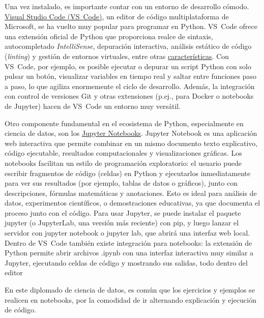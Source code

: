 Una vez instalado, es importante contar con un entorno de desarrollo cómodo. \href{https://code.visualstudio.com/}{Visual Studio Code (VS Code)}, 
un editor de código multiplataforma de Microsoft, se ha vuelto muy popular para programar en Python. VS Code ofrece una extensión oficial de Python 
que proporciona realce de sintaxis, autocompletado \textit{IntelliSense}, depuración interactiva, análisis estático de código (\textit{linting}) 
y gestión de entornos virtuales, entre otras \href{https://code.visualstudio.com/docs/languages/python#:~:text=Working%20with%20Python%20in%20Visual,including%20virtual%20and%20conda%20environments}{características}.
Con VS Code, por ejemplo, es posible ejecutar o depurar un script Python con solo pulsar un botón, visualizar variables en tiempo real y saltar entre
 funciones paso a paso, lo que agiliza enormemente el ciclo de desarrollo. Además, la integración con control de versiones Git y otras extensiones 
 (p.ej., para Docker o notebooks de Jupyter) hacen de VS Code un entorno muy versátil.

Otro componente fundamental en el ecosistema de Python, especialmente en ciencia de datos, son los \href{https://code.visualstudio.com/docs/datascience/jupyter-notebooks#:~:text=Jupyter%20Notebooks%20in%20VS%20Code,on%20one%20canvas%20called}
{Jupyter Notebooks}. Jupyter Notebook es una aplicación web interactiva que permite combinar en un mismo documento texto explicativo, 
código ejecutable, resultados computacionales y visualizaciones gráficas. Los notebooks facilitan un estilo de programación exploratorio: 
el usuario puede escribir fragmentos de código (celdas) en Python y ejecutarlos inmediatamente para ver sus resultados (por ejemplo, tablas de datos 
o gráficos), junto con descripciones, fórmulas matemáticas y anotaciones. 
Esto es ideal para análisis de datos, experimentos científicos, o demostraciones educativas, ya que documenta el proceso junto con el código. 
Para usar Jupyter, se puede instalar el paquete jupyter (o JupyterLab, una versión más reciente) con pip, y luego lanzar el servidor con jupyter 
notebook o jupyter lab, que abrirá una interfaz web local. Dentro de VS Code también existe integración para notebooks: la extensión de Python permite 
abrir archivos .ipynb con una interfaz interactiva muy similar a Jupyter, ejecutando celdas de código y mostrando sus salidas, todo dentro del editor

En este diplomado de ciencia de datos, es común que los ejercicios y ejemplos se realicen en notebooks, por la comodidad de ir alternando explicación 
y ejecución de código.


